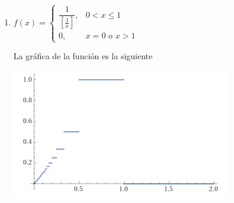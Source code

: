 \documentclass{report}
\begin{document}
\begin{enumerate}
\begin{enumerate}
                \item $f(x) = \begin{cases}
                    \dfrac{1}{\left[\frac{1}{x}\right]}, & 0 < x \leq 1\\
                    0, & x=0 \text{ o } x > 1
                \end{cases}$

                La gráfica de la función es la siguiente\\
                \begin{center}
                    \includegraphics[width=.5\textwidth]{images/grafica2.png}
                \end{center}
            \end{enumerate}
    \end{enumerate}
\end{document}
